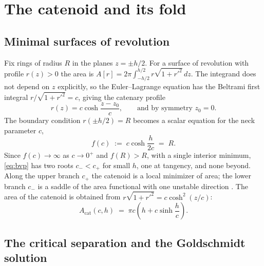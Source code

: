 \documentclass[11pt,a4paper]{article}
\begin{document}
\section{The catenoid and its fold}

\subsection{Minimal surfaces of revolution}

Fix rings of radius $R$ in the planes $z=\pm h/2$. For a surface of revolution
with profile $r(z)>0$ the area is
$A[r]=2\pi\int_{-h/2}^{h/2} r\sqrt{1+r'^2}\,dz$. The integrand does not depend
on $z$ explicitly, so the Euler--Lagrange equation has the Beltrami first
integral $r/\sqrt{1+r'^2}=c$, giving the catenary profile
\begin{equation}
r(z)=c\cosh\frac{z-z_0}{c},
\qquad\text{and by symmetry } z_0=0 .
\label{eq:catenary}
\end{equation}
The boundary condition $r(\pm h/2)=R$ becomes a scalar equation for the neck
parameter $c$,
\begin{equation}
f(c)\;:=\;c\cosh\frac{h}{2c}\;=\;R .
\label{eq:bvp}
\end{equation}
Since $f(c)\to\infty$ as $c\to0^{+}$ and $f(R)>R$, with a single interior
minimum, \eqref{eq:bvp} has two roots $c_-<c_+$ for small $h$, one at tangency,
and none beyond. Along the upper branch $c_+$ the catenoid is a local minimizer
of area; the lower branch $c_-$ is a saddle of the area functional with one
unstable direction \cite{dhs}. The area of the catenoid is obtained from
$r\sqrt{1+r'^2}=c\cosh^{2}(z/c)$:
\begin{equation}
A_{\mathrm{cat}}(c,h)\;=\;\pi c\left(h+c\sinh\frac{h}{c}\right).
\label{eq:area}
\end{equation}

\subsection{The critical separation and the Goldschmidt solution}
\end{document}
